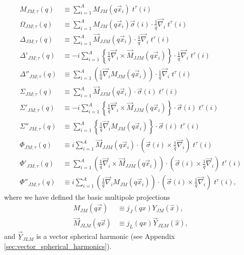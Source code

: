 \documentclass[12pt,letterpaper]{book}
\begin{document}
\begin{equation}
\begin{split}
M_{JM;\tau}(q)&\equiv \sum_{i=1}^AM_{JM}(q\vec{x}_i)\;t^{\tau}(i)\\
\Omega_{JM;\tau}(q)&\equiv \sum_{i=1}^AM_{JM}(q\vec{x}_i)\vec{\sigma}(i)\cdot\frac{1}{q}\vec{\nabla}_i\;t^{\tau}(i)\\
\Delta_{JM;\tau}(q)&\equiv \sum_{i=1}^A \vec{M}_{JJM}(q\vec{x}_i)\cdot\frac{1}{q}\vec{\nabla}_i\;t^{\tau}(i)\\
\Delta'_{JM;\tau}(q)&\equiv -i\sum_{i=1}^A \left\{\frac{1}{q}\vec{\nabla}_i\times\vec{M}_{JJM}(q\vec{x}_i)\right\}\cdot\frac{1}{q}\vec{\nabla}_i\;t^{\tau}(i)\\
\Delta''_{JM;\tau}(q)&\equiv \sum_{i=1}^A\left(\frac{1}{q}\vec{\nabla}_iM_{JM}(q\vec{x}_i)\right)\cdot\frac{1}{q}\vec{\nabla}_i\;t^{\tau}(i)\\
\Sigma_{JM;\tau}(q)&\equiv \sum_{i=1}^A\vec{M}_{JJM}(q\vec{x}_i)\cdot\vec{\sigma}(i)\;t^{\tau}(i)\\
\Sigma'_{JM;\tau}(q)&\equiv -i\sum_{i=1}^A\left\{\frac{1}{q}\vec{\nabla}_i\times\vec{M}_{JJM}(q\vec{x}_i)\right\}\cdot\vec{\sigma}(i)\;t^{\tau}(i)\\
\Sigma''_{JM;\tau}(q)&\equiv \sum_{i=1}^A\left\{\frac{1}{q}\vec{\nabla}_iM_{JM}(q\vec{x}_i)\right\}\cdot\vec{\sigma}(i)\;t^{\tau}(i)\\
\Phi_{JM;\tau}(q)&\equiv i\sum_{i=1}^A\vec{M}_{JJM}(q\vec{x}_i)\cdot\left(\vec{\sigma}(i)\times\frac{1}{q}\vec{\nabla}_i\right)\;t^{\tau}(i)\\
\Phi'_{JM;\tau}(q)&\equiv\sum_{i=1}^A\left(\frac{1}{q}\vec{\nabla}_i\times\vec{M}_{JJM}(q\vec{x}_i)\right)\cdot\left(\vec{\sigma}(i)\times\frac{1}{q}\vec{\nabla}_i\right)\;t^{\tau}(i)\\
\Phi''_{JM;\tau}(q)&\equiv i\sum_{i=1}^A\left(\frac{1}{q}\vec{\nabla}_iM_{JM}(q\vec{x}_i)\right)\cdot\left(\vec{\sigma}(i)\times\frac{1}{q}\vec{\nabla}_i\right)\;t^{\tau}(i),
\label{eq:single_nucleon_responses}
\end{split}
\end{equation}
where we have defined the basic multipole projections
\begin{equation}
\begin{split}
M_{JM}(q\vec{x})&\equiv j_J(qx)Y_{JM}(\hat{x}),\\
\vec{M}_{JLM}(q\vec{x})&\equiv j_L(qx)\vec{Y}_{JLM}(\hat{x}),
\end{split}
\end{equation}
and $\vec{Y}_{JLM}$ is a vector spherical harmonic (see Appendix \ref{sec:vector_spherical_harmonics}). 
\end{document}
